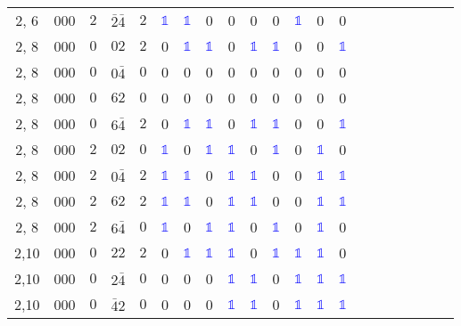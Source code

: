 \begin{longtable*}{c| cccccccccccccccccccc }
2, 6& 000& $2$& $\bar{2}\bar{4}$& $2$& \textcolor{blue}{$\mathds{1}$}& \textcolor{blue}{$\mathds{1}$}& 0& 0& 0& 0& \textcolor{blue}{$\mathds{1}$}& 0& 0\\
2, 8& 000& $0$& $02$& $2$& 0& \textcolor{blue}{$\mathds{1}$}& \textcolor{blue}{$\mathds{1}$}& 0& \textcolor{blue}{$\mathds{1}$}& \textcolor{blue}{$\mathds{1}$}& 0& 0& \textcolor{blue}{$\mathds{1}$}\\
2, 8& 000& $0$& $0\bar{4}$& $0$& 0& 0& 0& 0& 0& 0& 0& 0& 0\\
2, 8& 000& $0$& $62$& $0$& 0& 0& 0& 0& 0& 0& 0& 0& 0\\
2, 8& 000& $0$& $6\bar{4}$& $2$& 0& \textcolor{blue}{$\mathds{1}$}& \textcolor{blue}{$\mathds{1}$}& 0& \textcolor{blue}{$\mathds{1}$}& \textcolor{blue}{$\mathds{1}$}& 0& 0& \textcolor{blue}{$\mathds{1}$}\\
2, 8& 000& $2$& $02$& $0$& \textcolor{blue}{$\mathds{1}$}& 0& \textcolor{blue}{$\mathds{1}$}& \textcolor{blue}{$\mathds{1}$}& 0& \textcolor{blue}{$\mathds{1}$}& 0& \textcolor{blue}{$\mathds{1}$}& 0\\
2, 8& 000& $2$& $0\bar{4}$& $2$& \textcolor{blue}{$\mathds{1}$}& \textcolor{blue}{$\mathds{1}$}& 0& \textcolor{blue}{$\mathds{1}$}& \textcolor{blue}{$\mathds{1}$}& 0& 0& \textcolor{blue}{$\mathds{1}$}& \textcolor{blue}{$\mathds{1}$}\\
2, 8& 000& $2$& $62$& $2$& \textcolor{blue}{$\mathds{1}$}& \textcolor{blue}{$\mathds{1}$}& 0& \textcolor{blue}{$\mathds{1}$}& \textcolor{blue}{$\mathds{1}$}& 0& 0& \textcolor{blue}{$\mathds{1}$}& \textcolor{blue}{$\mathds{1}$}\\
2, 8& 000& $2$& $6\bar{4}$& $0$& \textcolor{blue}{$\mathds{1}$}& 0& \textcolor{blue}{$\mathds{1}$}& \textcolor{blue}{$\mathds{1}$}& 0& \textcolor{blue}{$\mathds{1}$}& 0& \textcolor{blue}{$\mathds{1}$}& 0\\
2,10& 000& $0$& $22$& $2$& 0& \textcolor{blue}{$\mathds{1}$}& \textcolor{blue}{$\mathds{1}$}& \textcolor{blue}{$\mathds{1}$}& 0& \textcolor{blue}{$\mathds{1}$}& \textcolor{blue}{$\mathds{1}$}& \textcolor{blue}{$\mathds{1}$}& 0\\
2,10& 000& $0$& $2\bar{4}$& $0$& 0& 0& 0& \textcolor{blue}{$\mathds{1}$}& \textcolor{blue}{$\mathds{1}$}& 0& \textcolor{blue}{$\mathds{1}$}& \textcolor{blue}{$\mathds{1}$}& \textcolor{blue}{$\mathds{1}$}\\
2,10& 000& $0$& $\bar{4}2$& $0$& 0& 0& 0& \textcolor{blue}{$\mathds{1}$}& \textcolor{blue}{$\mathds{1}$}& 0& \textcolor{blue}{$\mathds{1}$}& \textcolor{blue}{$\mathds{1}$}& \textcolor{blue}{$\mathds{1}$}\\

\end{longtable*}
